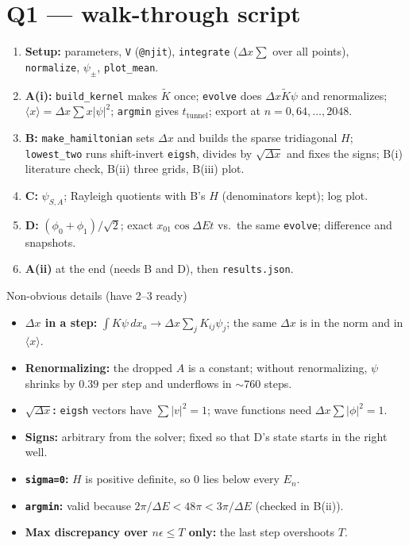 \documentclass[10pt]{article}
\newcommand{\code}[1]{\texttt{#1}}
\begin{document}
\section{Q1 --- walk-through script}
\begin{enumerate}[label=\textbf{\arabic*.}]
\item \textbf{Setup:} parameters, \code{V} (\code{@njit}), \code{integrate} ($\Delta x\sum$ over all points), \code{normalize}, $\psi_\pm$, \code{plot\_mean}.
\item \textbf{A(i):} \code{build\_kernel} makes $\tilde K$ once; \code{evolve} does $\Delta x\tilde K\psi$ and renormalizes; $\langle x\rangle=\Delta x\sum x|\psi|^2$; \code{argmin} gives $t_\text{tunnel}$; export at $n=0,64,\dots,2048$.
\item \textbf{B:} \code{make\_hamiltonian} sets $\Delta x$ and builds the sparse tridiagonal $H$; \code{lowest\_two} runs shift-invert \code{eigsh}, divides by $\sqrt{\Delta x}$ and fixes the signs; B(i) literature check, B(ii) three grids, B(iii) plot.
\item \textbf{C:} $\psi_{S,A}$; Rayleigh quotients with B's $H$ (denominators kept); log plot.
\item \textbf{D:} $(\phi_0+\phi_1)/\sqrt2$; exact $x_{01}\cos\Delta Et$ vs.\ the same \code{evolve}; difference and snapshots.
\item \textbf{A(ii)} at the end (needs B and D), then \code{results.json}.
\end{enumerate}
\begin{keybox}{Non-obvious details (have 2--3 ready)}
\begin{itemize}
\item \textbf{$\Delta x$ in a step:} $\int K\psi\,dx_a\to\Delta x\sum_jK_{ij}\psi_j$; the same $\Delta x$ is in the norm and in $\langle x\rangle$.
\item \textbf{Renormalizing:} the dropped $A$ is a constant; without renormalizing, $\psi$ shrinks by $0.39$ per step and underflows in $\sim760$ steps.
\item \textbf{$\sqrt{\Delta x}$:} \code{eigsh} vectors have $\sum|v|^2=1$; wave functions need $\Delta x\sum|\phi|^2=1$.
\item \textbf{Signs:} arbitrary from the solver; fixed so that D's state starts in the right well.
\item \textbf{\code{sigma=0}:} $H$ is positive definite, so $0$ lies below every $E_n$.
\item \textbf{\code{argmin}:} valid because $2\pi/\Delta E<48\pi<3\pi/\Delta E$ (checked in B(ii)).
\item \textbf{Max discrepancy over $n\epsilon\le T$ only:} the last step overshoots $T$.
\end{itemize}
\end{keybox}
\end{document}
